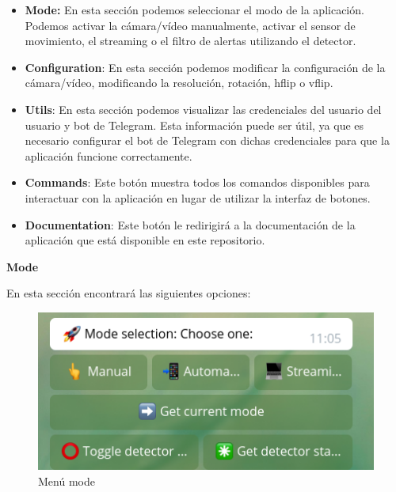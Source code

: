 \begin{itemize}
\item \textbf{Mode:} En esta sección podemos seleccionar el modo de la aplicación. Podemos activar la cámara/vídeo manualmente, activar el sensor de movimiento, el streaming o el filtro de alertas utilizando el detector.

\item \textbf{Configuration}: En esta sección podemos modificar la configuración de la cámara/vídeo, modificando la resolución, rotación, hflip o vflip.

\item \textbf{Utils}: En esta sección podemos visualizar las credenciales del usuario del usuario y bot de Telegram. Esta información puede ser útil, ya que es necesario configurar el bot de Telegram con dichas credenciales para que la aplicación funcione correctamente.

\item \textbf{Commands}: Este botón muestra todos los comandos disponibles para interactuar con la aplicación en lugar de utilizar la interfaz de botones.

\item \textbf{Documentation}: Este botón le redirigirá a la documentación de la aplicación que está disponible en este repositorio.

\end{itemize}

\textbf{Mode}

En esta sección encontrará las siguientes opciones:

\begin{figure}[H]
	\centering
	\includegraphics[scale=0.5]{images/60}
	\caption{Menú mode}
\end{figure}

